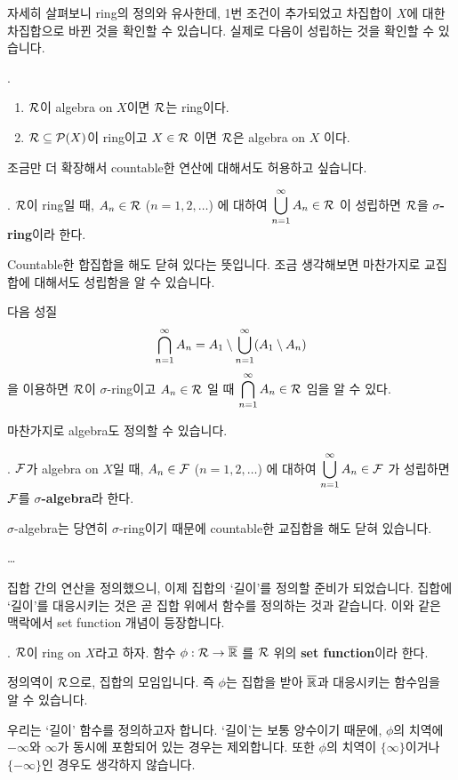 자세히 살펴보니 ring의 정의와 유사한데, 1번 조건이 추가되었고 차집합이 \(X\)에 대한 차집합으로 바뀐 것을 확인할 수 있습니다. 실제로 다음이 성립하는 것을 확인할 수 있습니다.

\prop.
\begin{enumerate}
    \item \(\mathcal{R}\)이 algebra on \(X\)이면 \(\mathcal{R}\)는 ring이다.
    \item \(\mathcal{R} \subseteq \mathcal{P}(X)\)이 ring이고 \(X \in \mathcal{R}\) 이면 \(\mathcal{R}\)은 algebra on \(X\) 이다.
\end{enumerate}

조금만 더 확장해서 countable한 연산에 대해서도 허용하고 싶습니다.

.  \(\mathcal{R}\)이 ring일 때, \(A_n \in \mathcal{R}\) (\(n = 1, 2, \dots\)) 에 대하여 \(\displaystyle \bigcup_{n=1}^\infty A_n \in \mathcal{R}\) 이 성립하면 \(\mathcal{R}\)을 \textbf{\(\sigma\)-ring}이라 한다.

Countable한 합집합을 해도 닫혀 있다는 뜻입니다. 조금 생각해보면 마찬가지로 교집합에 대해서도 성립함을 알 수 있습니다.

\rmk 다음 성질
\[
    \bigcap_{n=1}^\infty A_n = A_1 \setminus \bigcup_{n=1}^\infty (A_1 \setminus A_n)
\]
을 이용하면 \(\mathcal{R}\)이 \(\sigma\)-ring이고 \(A_n \in \mathcal{R}\) 일 때 \(\displaystyle \bigcap_{n=1}^\infty A_n \in \mathcal{R}\) 임을 알 수 있다.

마찬가지로 algebra도 정의할 수 있습니다.

.  \(\mathcal{F}\)가 algebra on \(X\)일 때, \(A_n \in \mathcal{F}\) (\(n = 1, 2, \dots\)) 에 대하여 \(\displaystyle \bigcup_{n=1}^\infty A_n \in \mathcal{F}\) 가 성립하면 \(\mathcal{F}\)를 \textbf{\(\sigma\)-algebra}라 한다.

\(\sigma\)-algebra는 당연히 \(\sigma\)-ring이기 때문에 countable한 교집합을 해도 닫혀 있습니다.

\dots

집합 간의 연산을 정의했으니, 이제 집합의 `길이'를 정의할 준비가 되었습니다. 집합에 `길이'를 대응시키는 것은 곧 집합 위에서 함수를 정의하는 것과 같습니다. 이와 같은 맥락에서 set function 개념이 등장합니다.

.  \(\mathcal{R}\)이 ring on \(X\)라고 하자. 함수 \(\phi : \mathcal{R} \rightarrow \overline{\mathbb{R}}\) 를 \(\mathcal{R}\) 위의 \textbf{set function}이라 한다.

정의역이 \(\mathcal{R}\)으로, 집합의 모임입니다. 즉 \(\phi\)는 집합을 받아 \(\overline{\mathbb{R}}\)과 대응시키는 함수임을 알 수 있습니다.

우리는 `길이' 함수를 정의하고자 합니다. `길이'는 보통 양수이기 때문에, \(\phi\)의 치역에 \(-\infty\)와 \(\infty\)가 동시에 포함되어 있는 경우는 제외합니다. 또한 \(\phi\)의 치역이 \(\{\infty\}\)이거나 \(\{-\infty\}\)인 경우도 생각하지 않습니다.

